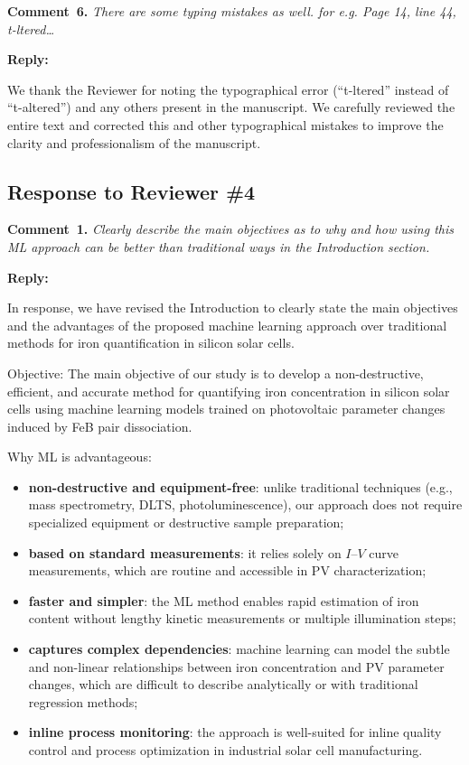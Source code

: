 \documentclass[a4paper,fleqn]{cas-sc}
\begin{document}
\vspace{1cm}
\noindent
\textcolor[rgb]{0.00,0.50,1.00}{\textbf{Comment~6.}}
\emph{There are some typing mistakes as well. for e.g. Page 14, line 44, t-ltered…}

\noindent
\textcolor[rgb]{0.51,0.00,0.00}{\textbf{Reply:}}

We thank the Reviewer for noting the typographical error (“t-ltered” instead of “t-altered”) and any others present in the manuscript. 
We carefully reviewed the entire text and corrected this and other typographical mistakes to improve the clarity and professionalism of the manuscript.

\vspace{1cm}
\subsection*{Response to Reviewer \#4 }

\noindent
\textcolor[rgb]{0.00,0.50,1.00}{\textbf{Comment~1.}}
\emph{Clearly describe the main objectives as to why and how using this ML approach can be better than traditional ways in the Introduction section.}

\noindent
\textcolor[rgb]{0.51,0.00,0.00}{\textbf{Reply:}}


In response, we have revised the Introduction to clearly state the main objectives and the advantages of the proposed machine learning approach over traditional methods for iron quantification in silicon solar cells.


Objective:
The main objective of our study is to develop a non-destructive, efficient, and accurate method for quantifying iron concentration in silicon solar cells using machine learning models trained on photovoltaic parameter changes induced by FeB pair dissociation.


Why ML is advantageous:
\begin{itemize}
    \item \textbf{non-destructive and equipment-free}: unlike traditional techniques (e.g., mass spectrometry, DLTS, photoluminescence), our approach does not require specialized equipment or destructive sample preparation;
    \item \textbf{based on standard measurements}: it relies solely on $I$–$V$ curve measurements, which are routine and accessible in PV characterization;
    \item \textbf{faster and simpler}: the ML method enables rapid estimation of iron content without lengthy kinetic measurements or multiple illumination steps;
    \item \textbf{captures complex dependencies}: machine learning can model the subtle and non-linear relationships between iron concentration and PV parameter changes, which are difficult to describe analytically or with traditional regression methods;
    \item \textbf{inline process monitoring}: the approach is well-suited for inline quality control and process optimization in industrial solar cell manufacturing.
\end{itemize}
\end{document}
